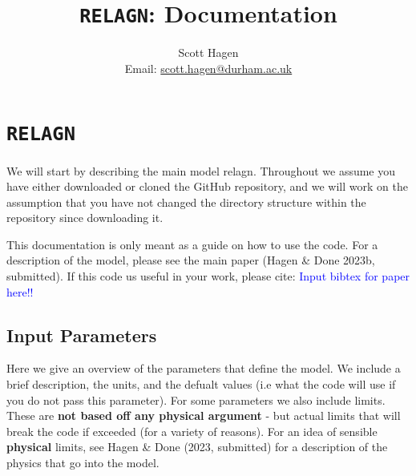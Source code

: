 \documentclass[a4paper, 11pt, times, onecolumn]{article}
\title{{\tt RELAGN}: Documentation}
\author{Scott Hagen \\ Email: \href{mailto:scott.hagen@durham.ac.uk}{scott.hagen@durham.ac.uk}}
\date{}
\begin{document}
\maketitle
\tableofcontents


\section{{\tt RELAGN}}

We will start by describing the main model {\sc relagn}. Throughout we assume you have either downloaded or cloned the GitHub repository, and we will work on the assumption that you have not changed the directory structure within the repository since downloading it.

This documentation is only meant as a guide on how to use the code. For a description of the model, please see the main paper (Hagen \& Done 2023b, submitted). If this code us useful in your work, please cite: \textcolor{blue}{Input bibtex for paper here!!}


\subsection{Input Parameters}

Here we give an overview of the parameters that define the model. We include a brief description, the units, and the defualt values (i.e what the code will use if you do not pass this parameter). For some parameters we also include limits. These are {\bf not based off any physical argument} - but actual limits that will break the code if exceeded (for a variety of reasons). For an idea of sensible {\bf physical} limits, see Hagen \& Done (2023, submitted) for a description of the physics that go into the model.
\end{document}
